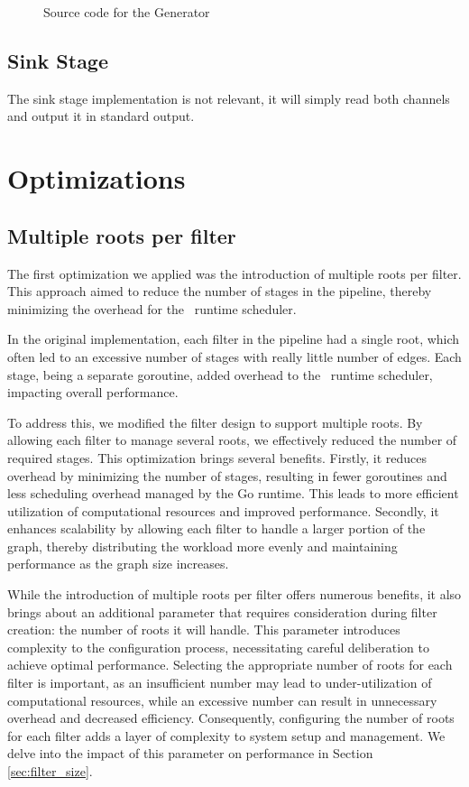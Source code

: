 \begin{figure}[H]
    \resizebox{\textwidth}{!}{
        
    }
    \caption{Source code for the Generator}
    \label{code:generator}
\end{figure}

\subsection*{Sink Stage}
The sink stage implementation is not relevant, it will simply read both channels and output it in standard output.

\section{Optimizations}

\subsection*{Multiple roots per filter\label{sec:dp:fsize}}
The first optimization we applied was the introduction of multiple roots per filter. This approach aimed to reduce the number of stages in the pipeline, thereby minimizing the overhead for the \Go\ runtime scheduler.

In the original implementation, each filter in the pipeline had a single root, which often led to an excessive number of stages with really little number of edges. Each stage, being a separate goroutine, added overhead to the \Go\ runtime scheduler, impacting overall performance.

To address this, we modified the filter design to support multiple roots. By allowing each filter to manage several roots, we effectively reduced the number of required stages. This optimization brings several benefits. Firstly, it reduces overhead by minimizing the number of stages, resulting in fewer goroutines and less scheduling overhead managed by the Go runtime. This leads to more efficient utilization of computational resources and improved performance. Secondly, it enhances scalability by allowing each filter to handle a larger portion of the graph, thereby distributing the workload more evenly and maintaining performance as the graph size increases. 

While the introduction of multiple roots per filter offers numerous benefits, it also brings about an additional parameter that requires consideration during filter creation: the number of roots it will handle. This parameter introduces complexity to the configuration process, necessitating careful deliberation to achieve optimal performance. Selecting the appropriate number of roots for each filter is important, as an insufficient number may lead to under-utilization of computational resources, while an excessive number can result in unnecessary overhead and decreased efficiency. Consequently, configuring the number of roots for each filter adds a layer of complexity to system setup and management. We delve into the impact of this parameter on performance in Section \ref{sec:filter_size}.

